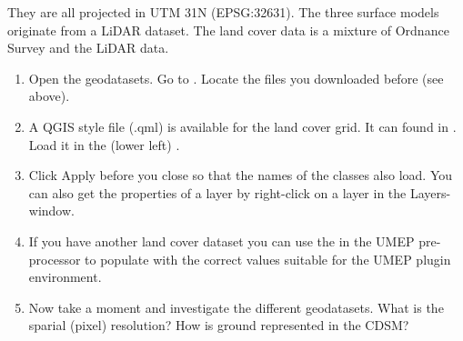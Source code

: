\documentclass[letterpaper,10pt,english]{sphinxmanual}
\begin{document}
They are all projected in UTM 31N (EPSG:32631). The three surface models
originate from a LiDAR dataset. The land cover data is a mixture of
Ordnance Survey and the LiDAR data.
\begin{enumerate}
\item {} 
Open the geodatasets. Go to .
Locate the files you downloaded before (see above).

\item {} 
A QGIS style file (.qml) is available for the land cover grid. It can
found in . Load it in the  (lower left) .

\item {} 
Click Apply before you close so that the names of the classes also
load. You can also get the properties of a layer by right-click on a
layer in the Layers-window.

\item {} 
If you have another land cover dataset you can use the
{\hyperref[\detokenize{pre-processor/Urban Land Cover Land Cover Reclassifier:landcoverreclassifier}]{}}
in the UMEP pre-processor to populate with the correct values
suitable for the UMEP plugin environment.

\item {} 
Now take a moment and investigate the different geodatasets. What is
the sparial (pixel) resolution? How is ground represented in the
CDSM?

\end{enumerate}
\end{document}
